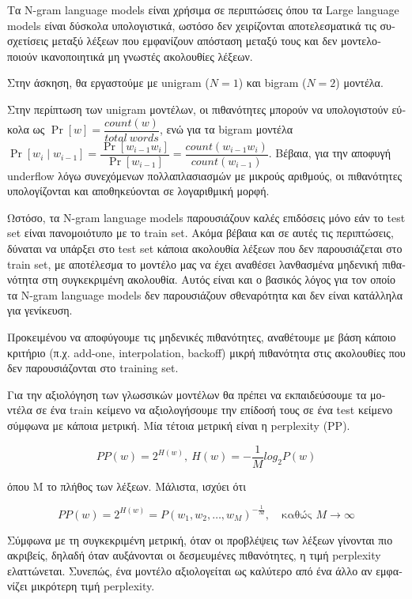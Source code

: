 \documentclass[a4paper,11pt]{article}
\begin{document}
\textgreek{Τα }N-gram language models\textgreek{ είναι χρήσιμα σε περιπτώσεις όπου τα }Large language models \textgreek{είναι δύσκολα υπολογιστικά, ωστόσο δεν χειρίζονται αποτελεσματικά τις συσχετίσεις μεταξύ λέξεων που εμφανίζουν απόσταση μεταξύ τους και δεν μοντελοποιούν ικανοποιητικά μη γνωστές ακολουθίες λέξεων. }

\textgreek{Στην άσκηση, θα εργαστούμε με }unigram ($N=1$) \textgreek{και }bigram ($N=2$) \textgreek{μοντέλα.}

\textgreek{Στην περίπτωση των }unigram \textgreek{μοντέλων, οι πιθανότητες μπορούν να υπολογιστούν εύκολα ως } $\Pr[w]=\dfrac{count(w)}{total \ words}$, \textgreek{ενώ για τα }bigram \textgreek{μοντέλα} $\Pr[w_{i} \mid w_{i-1}]=\dfrac{\Pr[w_{i-1}w_{i}]}{\Pr[w_{i-1}]}=\dfrac{count(w_{i-1}w_{i})}{count(w_{i-1})}$. \textgreek{Βέβαια, για την αποφυγή }underflow\textgreek{ λόγω συνεχόμενων πολλαπλασιασμών με μικρούς αριθμούς, οι πιθανότητες υπολογίζονται και αποθηκεύονται σε λογαριθμική μορφή.}

\textgreek{Ωστόσο, τα }N-gram language models \textgreek{παρουσιάζουν καλές επιδόσεις μόνο εάν το }test set \textgreek{είναι πανομοιότυπο με το }train set. \textgreek{Ακόμα βέβαια και σε αυτές τις περιπτώσεις, δύναται να υπάρξει στο }test set \textgreek{κάποια ακολουθία λέξεων που δεν παρουσιάζεται στο }train set, \textgreek{με αποτέλεσμα το μοντέλο μας να έχει αναθέσει λανθασμένα μηδενική πιθανότητα στη συγκεκριμένη ακολουθία. Αυτός είναι και ο βασικός λόγος για τον οποίο τα }N-gram language models \textgreek{δεν παρουσιάζουν σθεναρότητα και δεν είναι κατάλληλα για γενίκευση.}

\textgreek{Προκειμένου να αποφύγουμε τις μηδενικές πιθανότητες, αναθέτουμε με βάση κάποιο κριτήριο (π.χ. }add-one, interpolation, backoff) \textgreek{μικρή πιθανότητα στις ακολουθίες που δεν παρουσιάζονται στο }training set.

\textgreek{Για την αξιολόγηση των γλωσσικών μοντέλων θα πρέπει να εκπαιδεύσουμε τα μοντέλα σε ένα }train \textgreek{κείμενο να αξιολογήσουμε την επίδοσή τους σε ένα }test \textgreek{κείμενο σύμφωνα με κάποια μετρική. Μία τέτοια μετρική είναι η }perplexity (PP).

\[
PP(w) = 2^{H(w)}, \ H(w) =− \dfrac{1}{M} log_2P(w)
\]

\textgreek{όπου Μ το πλήθος των λέξεων. Μάλιστα, ισχύει ότι}

\[
PP(w) = 2^{H(w)} = P(w_1, w_2, \ldots, w_M)^{-\frac{1}{M}}, \quad \text{καθώς } M \to \infty
\]

\textgreek{Σύμφωνα με τη συγκεκριμένη μετρική, όταν οι προβλέψεις των λέξεων γίνονται πιο ακριβείς, δηλαδή όταν αυξάνονται οι δεσμευμένες πιθανότητες, η τιμή }perplexity \textgreek{ελαττώνεται. Συνεπώς, ένα μοντέλο αξιολογείται ως καλύτερο από ένα άλλο αν εμφανίζει μικρότερη τιμή }perplexity. 
\end{document}

